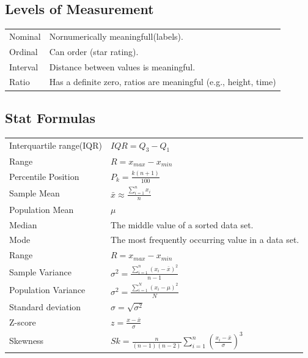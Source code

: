 \documentclass[5pt]{article}
\begin{document}
\begin{multicols}{2}
\subsection{Levels of Measurement}
\begin{tabular}{LL}
  Nominal  & Nornumerically meaningfull(labels).\\
  Ordinal  & Can order (star rating).\\
  Interval & Distance between values is meaningful.\\
  Ratio    & Has a definite zero, ratios are meaningful (e.g., height, time)\\
\end{tabular}

\subsection{Stat Formulas}
\begin{tabular}{LL}
  Interquartile range(IQR) & $IQR=Q_3-Q_1$\\
  Range                    & $R=x_{max}-x_{min}$\\
  Percentile Position      & $P_k=\frac{k(n+1)}{100}$\\
  Sample Mean              & $\bar{x}\approx\frac{\sum_{i=1}^{n}x_i}{n}$\\
  Population Mean          & $\mu$\\
  Median                   & The middle value of a sorted data set.\\
  Mode                     & The most frequently occurring value in a data set.\\
  Range                    & $R=x_{max}-x_{min}$\\
  Sample Variance          & $\sigma^2=\frac{\sum_{i=1}^{n}(x_i-\bar{x})^2}{n-1}$\\
  Population Variance      & $\sigma^2=\frac{\sum_{i=1}^{N}(x_i-\mu)^2}{N}$\\
  Standard deviation       & $\sigma=\sqrt{\sigma^2}$\\
  Z-score                  & $z=\frac{x-\bar{x}}{\sigma}$\\
  Skewness                 & $Sk=\frac{n}{(n-1)(n-2)}\sum_{i=1}^{n}\left(\frac{x_i-\bar{x}}{\sigma}\right)^3$\\
\end{tabular}


\end{multicols}
\end{document}
